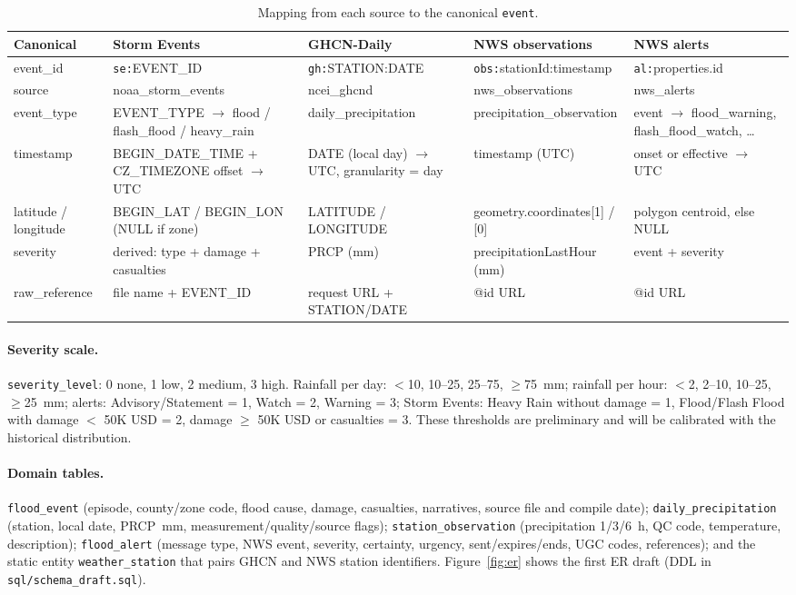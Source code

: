 \documentclass[11pt,letterpaper]{article}
\begin{document}
\begin{table}[H]\centering\scriptsize
\caption{Mapping from each source to the canonical \texttt{event}.}\label{tab:map}
\begin{tabular}{@{}p{1.8cm}p{3.3cm}p{3.1cm}p{3.1cm}p{3.3cm}@{}}\toprule
Canonical & Storm Events & GHCN-Daily & NWS observations & NWS alerts\\\midrule
event\_id & \texttt{se:}EVENT\_ID & \texttt{gh:}STATION:DATE & \texttt{obs:}stationId:timestamp & \texttt{al:}properties.id\\
source & noaa\_storm\_events & ncei\_ghcnd & nws\_observations & nws\_alerts\\
event\_type & EVENT\_TYPE $\rightarrow$ flood / flash\_flood / heavy\_rain & daily\_precipitation & precipitation\_observation & event $\rightarrow$ flood\_warning, flash\_flood\_watch, \ldots\\
timestamp & BEGIN\_DATE\_TIME + CZ\_TIMEZONE offset $\rightarrow$ UTC & DATE (local day) $\rightarrow$ UTC, granularity = day & timestamp (UTC) & onset or effective $\rightarrow$ UTC\\
latitude / longitude & BEGIN\_LAT / BEGIN\_LON (NULL if zone) & LATITUDE / LONGITUDE & geometry.coordinates[1] / [0] & polygon centroid, else NULL\\
severity & derived: type + damage + casualties & PRCP (mm) & precipitationLastHour (mm) & event + severity\\
raw\_reference & file name + EVENT\_ID & request URL + STATION/DATE & @id URL & @id URL\\
\bottomrule\end{tabular}
\end{table}

\paragraph{Severity scale.} \texttt{severity\_level}: 0 none, 1 low, 2 medium, 3 high. Rainfall per day: $<$10, 10--25, 25--75, $\geq$75~mm; rainfall per hour: $<$2, 2--10, 10--25, $\geq$25~mm; alerts: Advisory/Statement = 1, Watch = 2, Warning = 3; Storm Events: Heavy Rain without damage = 1, Flood/Flash Flood with damage $<$ 50K USD = 2, damage $\geq$ 50K USD or casualties = 3. These thresholds are preliminary and will be calibrated with the historical distribution.

\paragraph{Domain tables.} \texttt{flood\_event} (episode, county/zone code, flood cause, damage, casualties, narratives, source file and compile date); \texttt{daily\_precipitation} (station, local date, PRCP~mm, measurement/quality/source flags); \texttt{station\_observation} (precipitation 1/3/6~h, QC code, temperature, description); \texttt{flood\_alert} (message type, NWS event, severity, certainty, urgency, sent/expires/ends, UGC codes, references); and the static entity \texttt{weather\_station} that pairs GHCN and NWS station identifiers. Figure~\ref{fig:er} shows the first ER draft (DDL in \texttt{sql/schema\_draft.sql}).
\end{document}
